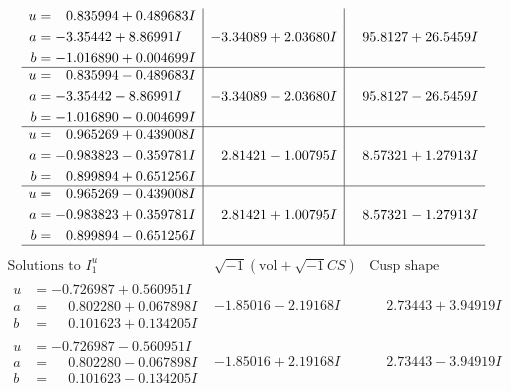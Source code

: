 \documentclass[1p]{elsarticle_modified}
\theoremstyle{definition}
\newcommand{\I}{\sqrt{-1}}
\begin{document}
$$\begin{array}{c|c|c}
\begin{aligned}
u &= \phantom{-}0.835994 + 0.489683 I \\
a &= -3.35442 + 8.86991 I \\
b &= -1.016890 + 0.004699 I\end{aligned}
 & -3.34089 + 2.03680 I & \phantom{-}95.8127 + 26.5459 I \\ \hline\begin{aligned}
u &= \phantom{-}0.835994 - 0.489683 I \\
a &= -3.35442 - 8.86991 I \\
b &= -1.016890 - 0.004699 I\end{aligned}
 & -3.34089 - 2.03680 I & \phantom{-}95.8127 - 26.5459 I \\ \hline\begin{aligned}
u &= \phantom{-}0.965269 + 0.439008 I \\
a &= -0.983823 - 0.359781 I \\
b &= \phantom{-}0.899894 + 0.651256 I\end{aligned}
 & \phantom{-}2.81421 - 1.00795 I & \phantom{-}8.57321 + 1.27913 I \\ \hline\begin{aligned}
u &= \phantom{-}0.965269 - 0.439008 I \\
a &= -0.983823 + 0.359781 I \\
b &= \phantom{-}0.899894 - 0.651256 I\end{aligned}
 & \phantom{-}2.81421 + 1.00795 I & \phantom{-}8.57321 - 1.27913 I\\
 \hline 
 \end{array}$$\newpage$$\begin{array}{c|c|c}  
\text{Solutions to }I^u_{1}& \I (\text{vol} + \sqrt{-1}CS) & \text{Cusp shape}\\
 \hline 
\begin{aligned}
u &= -0.726987 + 0.560951 I \\
a &= \phantom{-}0.802280 + 0.067898 I \\
b &= \phantom{-}0.101623 + 0.134205 I\end{aligned}
 & -1.85016 - 2.19168 I & \phantom{-}2.73443 + 3.94919 I \\ \hline\begin{aligned}
u &= -0.726987 - 0.560951 I \\
a &= \phantom{-}0.802280 - 0.067898 I \\
b &= \phantom{-}0.101623 - 0.134205 I\end{aligned}
 & -1.85016 + 2.19168 I & \phantom{-}2.73443 - 3.94919 I \\ \hline\begin{aligned}

\end{aligned}
\end{array}$$
\end{document}
